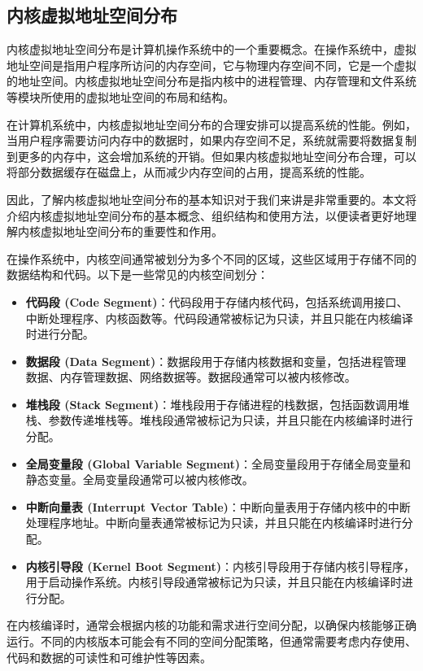 \subsection{内核虚拟地址空间分布}

内核虚拟地址空间分布是计算机操作系统中的一个重要概念。在操作系统中，虚拟地址空间是指用户程序所访问的内存空间，它与物理内存空间不同，它是一个虚拟的地址空间。内核虚拟地址空间分布是指内核中的进程管理、内存管理和文件系统等模块所使用的虚拟地址空间的布局和结构。

在计算机系统中，内核虚拟地址空间分布的合理安排可以提高系统的性能。例如，当用户程序需要访问内存中的数据时，如果内存空间不足，系统就需要将数据复制到更多的内存中，这会增加系统的开销。但如果内核虚拟地址空间分布合理，可以将部分数据缓存在磁盘上，从而减少内存空间的占用，提高系统的性能。

因此，了解内核虚拟地址空间分布的基本知识对于我们来讲是非常重要的。本文将介绍内核虚拟地址空间分布的基本概念、组织结构和使用方法，以便读者更好地理解内核虚拟地址空间分布的重要性和作用。

在操作系统中，内核空间通常被划分为多个不同的区域，这些区域用于存储不同的数据结构和代码。以下是一些常见的内核空间划分：
\begin{itemize}
	\item \textbf{代码段 (Code Segment)}：代码段用于存储内核代码，包括系统调用接口、中断处理程序、内核函数等。代码段通常被标记为只读，并且只能在内核编译时进行分配。
	\item \textbf{数据段 (Data Segment)}：数据段用于存储内核数据和变量，包括进程管理数据、内存管理数据、网络数据等。数据段通常可以被内核修改。
	\item \textbf{堆栈段 (Stack Segment)}：堆栈段用于存储进程的栈数据，包括函数调用堆栈、参数传递堆栈等。堆栈段通常被标记为只读，并且只能在内核编译时进行分配。
	\item \textbf{全局变量段 (Global Variable Segment)}：全局变量段用于存储全局变量和静态变量。全局变量段通常可以被内核修改。
	\item \textbf{中断向量表 (Interrupt Vector Table)}：中断向量表用于存储内核中的中断处理程序地址。中断向量表通常被标记为只读，并且只能在内核编译时进行分配。
	\item \textbf{内核引导段 (Kernel Boot Segment)}：内核引导段用于存储内核引导程序，用于启动操作系统。内核引导段通常被标记为只读，并且只能在内核编译时进行分配。
\end{itemize}

在内核编译时，通常会根据内核的功能和需求进行空间分配，以确保内核能够正确运行。不同的内核版本可能会有不同的空间分配策略，但通常需要考虑内存使用、代码和数据的可读性和可维护性等因素。


